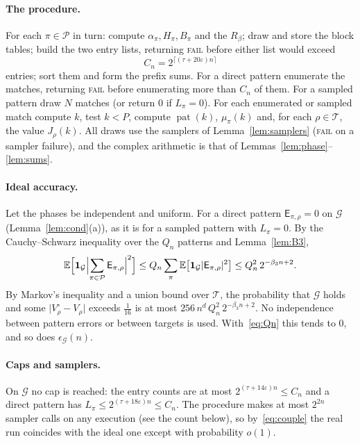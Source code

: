 \documentclass[11pt]{article}
\theoremstyle{definition}
\newcommand{\E}{\mathbb E}
\newcommand{\eps}{\varepsilon}
\newcommand{\abs}[1]{\lvert #1\rvert}
\newcommand{\ceil}[1]{\lceil #1\rceil}
\newcommand{\cG}{\mathcal G}
\newcommand{\cP}{\mathcal P}
\newcommand{\cT}{\mathcal T}
\newcommand{\pat}{\operatorname{pat}}
\begin{document}
\paragraph{The procedure.} For each $\pi\in\cP$ in turn: compute $\alpha_\pi,H_\pi,B_\pi$ and the $R_\beta$; draw and
store the block tables; build the two entry lists, returning \textsc{fail} before either list would exceed
\begin{equation}\label{eq:Cn}
 C_n=2^{\ceil{(\tau+20\eps)n}}
\end{equation}
entries; sort them and form the prefix sums. For a direct pattern enumerate the matches, returning \textsc{fail}
before enumerating more than $C_n$ of them. For a sampled pattern draw $N$ matches (or return $0$ if $L_\pi=0$).
For each enumerated or sampled match compute $k$, test $k<P$, compute $\pat(k)$, $\mu_\pi(k)$ and, for each
$\rho\in\cT$, the value $J_\rho(k)$. All draws use the samplers of Lemma~\ref{lem:samplers} (\textsc{fail} on a
sampler failure), and the complex arithmetic is that of Lemmas~\ref{lem:phase}--\ref{lem:sums}.

\paragraph{Ideal accuracy.} Let the phases be independent and uniform. For a direct pattern
$\mathsf E_{\pi,\rho}=0$ on $\cG$ (Lemma~\ref{lem:cond}(a)), as it is for a sampled pattern with $L_\pi=0$. By the
Cauchy--Schwarz inequality over the $Q_n$ patterns and Lemma~\ref{lem:B3},
\[
 \E\Bigl[\mathbf 1_{\cG}\Bigl\lvert\sum_{\pi\in\cP}\mathsf E_{\pi,\rho}\Bigr\rvert^2\Bigr]
 \le Q_n\sum_{\pi}\E\bigl[\mathbf 1_{\cG}\abs{\mathsf E_{\pi,\rho}}^2\bigr]\le Q_n^2\,2^{-\beta_3n+2}.
\]
By Markov's inequality and a union bound over $\cT$, the probability that $\cG$ holds and some
$\abs{V^\circ_\rho-V_\rho}$ exceeds $\tfrac1{16}$ is at most $256\,n^d\,Q_n^2\,2^{-\beta_3n+2}$. No independence between
pattern errors or between targets is used. With~\eqref{eq:Qn} this tends to $0$, and so does $\epsilon_{\cG}(n)$.

\paragraph{Caps and samplers.} On $\cG$ no cap is reached: the entry counts are at most
$2^{(\tau+14\eps)n}\le C_n$ and a direct pattern has $L_\pi\le2^{(\tau+18\eps)n}\le C_n$. The procedure makes at most
$2^{2n}$ sampler calls on any execution (see the count below), so by~\eqref{eq:couple} the real run coincides with
the ideal one except with probability $o(1)$.
\end{document}
